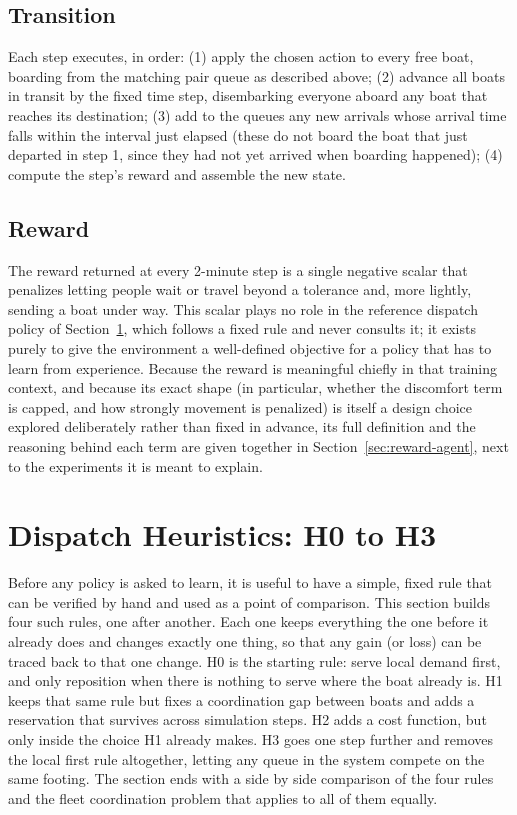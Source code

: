 \documentclass[11pt,a4paper]{article}
\begin{document}
\subsection{Transition}

Each step executes, in order: (1) apply the chosen action to every free boat, boarding from the matching pair queue as described above; (2) advance all boats in transit by the fixed time step, disembarking everyone aboard any boat that reaches its destination; (3) add to the queues any new arrivals whose arrival time falls within the interval just elapsed (these do not board the boat that just departed in step 1, since they had not yet arrived when boarding happened); (4) compute the step's reward and assemble the new state.

\subsection{Reward}

The reward returned at every 2-minute step is a single negative scalar that penalizes letting people wait or travel beyond a tolerance and, more lightly, sending a boat under way. This scalar plays no role in the reference dispatch policy of Section~\ref{sec:politica-base}, which follows a fixed rule and never consults it; it exists purely to give the environment a well-defined objective for a policy that has to learn from experience. Because the reward is meaningful chiefly in that training context, and because its exact shape (in particular, whether the discomfort term is capped, and how strongly movement is penalized) is itself a design choice explored deliberately rather than fixed in advance, its full definition and the reasoning behind each term are given together in Section~\ref{sec:reward-agent}, next to the experiments it is meant to explain.

\section{Dispatch Heuristics: H0 to H3}
\label{sec:politica-base}

Before any policy is asked to learn, it is useful to have a simple, fixed rule that can be verified by hand and used as a point of comparison. This section builds four such rules, one after another. Each one keeps everything the one before it already does and changes exactly one thing, so that any gain (or loss) can be traced back to that one change. H0 is the starting rule: serve local demand first, and only reposition when there is nothing to serve where the boat already is. H1 keeps that same rule but fixes a coordination gap between boats and adds a reservation that survives across simulation steps. H2 adds a cost function, but only inside the choice H1 already makes. H3 goes one step further and removes the local first rule altogether, letting any queue in the system compete on the same footing. The section ends with a side by side comparison of the four rules and the fleet coordination problem that applies to all of them equally.
\end{document}
